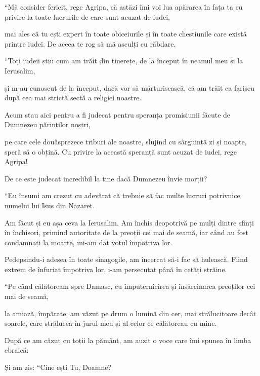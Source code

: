 {“Mă consider fericit, rege Agripa, că astăzi îmi voi lua apărarea în fața ta cu privire la toate lucrurile de care sunt acuzat de iudei,

mai ales că tu ești expert în toate obiceiurile și în toate chestiunile care există printre iudei. De aceea te rog să mă asculți cu răbdare.


\par }{\PP {}“Toți iudeii știu cum am trăit din tinerețe, de la început în neamul meu și la Ierusalim,

și m-au cunoscut de la început, dacă vor să mărturisească, că am trăit ca fariseu după cea mai strictă sectă a religiei noastre.

Acum stau aici pentru a fi judecat pentru speranța promisiunii făcute de Dumnezeu părinților noștri,

pe care cele douăsprezece triburi ale noastre, slujind cu sârguință zi și noapte, speră să o obțină. Cu privire la această speranță sunt acuzat de iudei, rege Agripa!

De ce este judecat incredibil la tine dacă Dumnezeu învie morții?


\par }{\PP {}“Eu însumi am crezut cu adevărat că trebuie să fac multe lucruri potrivnice numelui lui Isus din Nazaret.

Am făcut și eu așa ceva la Ierusalim. Am închis deopotrivă pe mulți dintre sfinți în închisori, primind autoritate de la preoții cei mai de seamă, iar când au fost condamnați la moarte, mi-am dat votul împotriva lor.

Pedepsindu-i adesea în toate sinagogile, am încercat să-i fac să hulească. Fiind extrem de înfuriat împotriva lor, i-am persecutat până în cetăți străine.


\par }{\PP {}“Pe când călătoream spre Damasc, cu împuternicirea și însărcinarea preoților cei mai de seamă,

la amiază, împărate, am văzut pe drum o lumină din cer, mai strălucitoare decât soarele, care strălucea în jurul meu și al celor ce călătoreau cu mine.

După ce am căzut cu toții la pământ, am auzit o voce care îmi spunea în limba ebraică:
{}


\par }{\PP {}Și am zis: “Cine ești Tu, Doamne?

}
